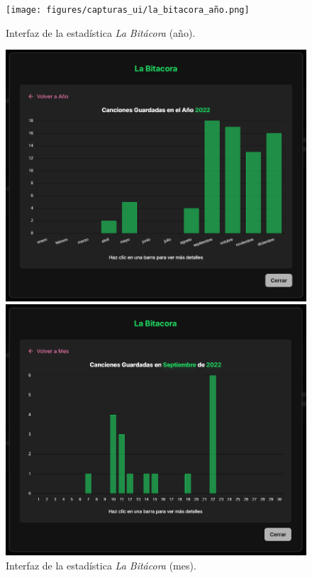 \begin{figure}[H]
    \centering
    \vspace{-10pt}
    \begin{minipage}{0.32\textwidth}
        \centering
        \texttt{[image: figures/capturas\_ui/la\_bitacora\_año.png]}
        \caption{Interfaz de la estadística \textit{La Bitácora} (año).}
        \label{fig:la_bitacora_año}
    \end{minipage}
    \begin{minipage}{0.32\textwidth}
        \centering
        \includegraphics[width=\textwidth]{figures/capturas_ui/la_bitacora_mes.png}
        \caption{Interfaz de la estadística \textit{La Bitácora} (mes).}
        \label{fig:la_bitacora_mes}
    \end{minipage}
    \begin{minipage}{0.32\textwidth}
        \centering
        \includegraphics[width=\textwidth]{figures/capturas_ui/la_bitacora_dia.png}

\end{minipage}
\end{figure}
